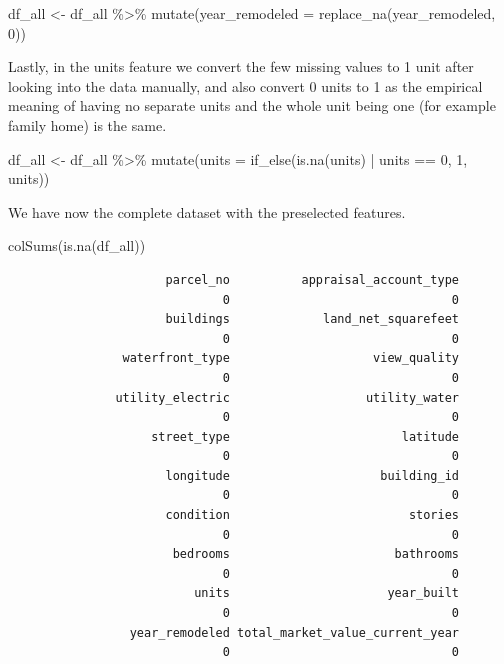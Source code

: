 \documentclass[
  english,
  letterpaper,
  DIV=11,
  numbers=noendperiod]{scrreprt}
\newenvironment{Shaded}{\begin{snugshade}}{\end{snugshade}}
\newcommand{\AttributeTok}[1]{\textcolor[rgb]{0.40,0.45,0.13}{#1}}
\newcommand{\DecValTok}[1]{\textcolor[rgb]{0.68,0.00,0.00}{#1}}
\newcommand{\FunctionTok}[1]{\textcolor[rgb]{0.28,0.35,0.67}{#1}}
\newcommand{\NormalTok}[1]{\textcolor[rgb]{0.00,0.23,0.31}{#1}}
\newcommand{\OtherTok}[1]{\textcolor[rgb]{0.00,0.23,0.31}{#1}}
\newcommand{\SpecialCharTok}[1]{\textcolor[rgb]{0.37,0.37,0.37}{#1}}
\begin{document}
\begin{Shaded}
\begin{Highlighting}[]
\NormalTok{df\_all }\OtherTok{\textless{}{-}}\NormalTok{ df\_all }\SpecialCharTok{\%\textgreater{}\%} 
  \FunctionTok{mutate}\NormalTok{(}\AttributeTok{year\_remodeled =} \FunctionTok{replace\_na}\NormalTok{(year\_remodeled, }\DecValTok{0}\NormalTok{))}
\end{Highlighting}
\end{Shaded}

Lastly, in the units feature we convert the few missing values to 1 unit
after looking into the data manually, and also convert 0 units to 1 as
the empirical meaning of having no separate units and the whole unit
being one (for example family home) is the same.

\begin{Shaded}
\begin{Highlighting}[]
\NormalTok{df\_all }\OtherTok{\textless{}{-}}\NormalTok{ df\_all }\SpecialCharTok{\%\textgreater{}\%}
  \FunctionTok{mutate}\NormalTok{(}\AttributeTok{units =} \FunctionTok{if\_else}\NormalTok{(}\FunctionTok{is.na}\NormalTok{(units) }\SpecialCharTok{|}\NormalTok{ units }\SpecialCharTok{==} \DecValTok{0}\NormalTok{, }\DecValTok{1}\NormalTok{, units))}
\end{Highlighting}
\end{Shaded}

We have now the complete dataset with the preselected features.

\begin{Shaded}
\begin{Highlighting}[]
\FunctionTok{colSums}\NormalTok{(}\FunctionTok{is.na}\NormalTok{(df\_all))}
\end{Highlighting}
\end{Shaded}

\begin{verbatim}
                      parcel_no          appraisal_account_type 
                              0                               0 
                      buildings             land_net_squarefeet 
                              0                               0 
                waterfront_type                    view_quality 
                              0                               0 
               utility_electric                   utility_water 
                              0                               0 
                    street_type                        latitude 
                              0                               0 
                      longitude                     building_id 
                              0                               0 
                      condition                         stories 
                              0                               0 
                       bedrooms                       bathrooms 
                              0                               0 
                          units                      year_built 
                              0                               0 
                 year_remodeled total_market_value_current_year 
                              0                               0 
\end{verbatim}
\end{document}
